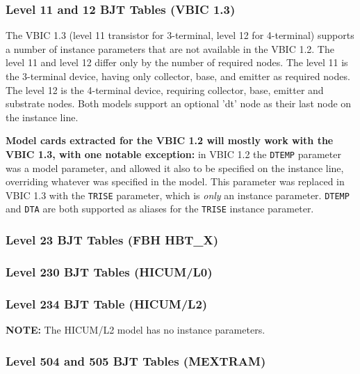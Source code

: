 \subsubsection{Level 11 and 12 BJT Tables (VBIC 1.3)}
The VBIC 1.3 (level 11 transistor for 3-terminal, level 12 for
4-terminal) supports a number of instance parameters that are not
available in the VBIC 1.2.  The level 11 and level 12 differ only by
the number of required nodes.  The level 11 is the 3-terminal device,
having only collector, base, and emitter as required nodes.  The level
12 is the 4-terminal device, requiring collector, base, emitter and
substrate nodes.  Both models support an optional 'dt' node as their
last node on the instance line.

\textbf{Model cards extracted for the VBIC 1.2 will mostly work with the VBIC
1.3,  with one notable exception:} in VBIC 1.2 the \texttt{DTEMP} parameter was
a model parameter, and \Xyce{} allowed it also to be specified on the instance
line, overriding whatever was specified in the model.  This parameter was
replaced in VBIC 1.3 with the \texttt{TRISE} parameter, which is {\em only\/}
an instance parameter.  \texttt{DTEMP} and \texttt{DTA} are both supported as
aliases for the \texttt{TRISE} instance parameter.



\clearpage


\clearpage

\subsubsection{Level 23 BJT Tables (FBH HBT\_X)}


\clearpage

\subsubsection{Level 230 BJT Tables (HICUM/L0)}


\clearpage

\subsubsection{Level 234 BJT Table (HICUM/L2)}
\textbf{NOTE:} The HICUM/L2 model has no instance parameters.

\clearpage

\subsubsection{Level 504 and 505 BJT Tables (MEXTRAM)}


\clearpage



\clearpage

